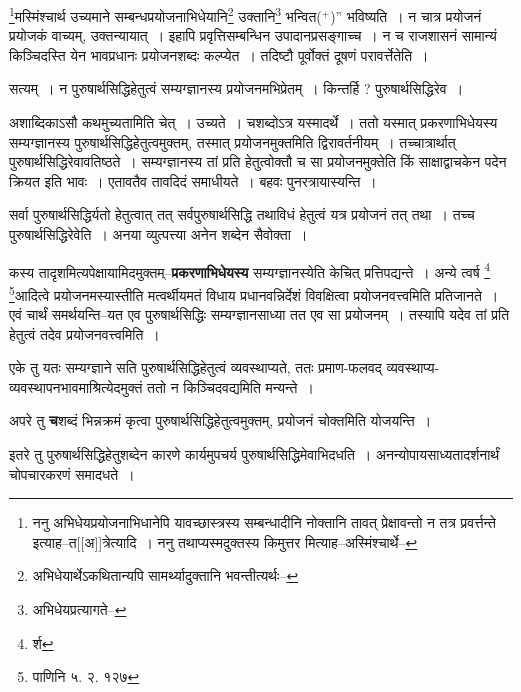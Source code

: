 \documentclass[article,12pt,a4paper]{memoir}
\newcommand{\add}[1]{($^{+}$#1)}
\begin{document}
	\footnote{ननु अभिधेयप्रयोजनाभिधानेपि यावच्छास्त्रस्य सम्बन्धादीनि नोक्तानि तावत् प्रेक्षावन्तो न तत्र प्रवर्त्तन्ते इत्याह--त[[अ]]त्रेत्यादि । ननु तथाप्यस्मदुक्तस्य किमुत्तर मित्याह--अस्मिंश्चार्थे--\cite{dp-msD-n}}\-मस्मिंश्चार्थ उच्यमाने सम्बन्धप्रयोजनाभिधेयानि\footnote{अभिधेयार्थेऽकथितान्यपि सामर्थ्यादुक्तानि भवन्तीत्यर्थः--\cite{dp-msD-n}} उक्तानि\footnote{अभिधेयप्रत्यागते--} भन्वित\add{}” भविष्यति । न चात्र प्रयोजनं प्रयोजकं वाच्यम्, उक्तन्यायात् । इहापि प्रवृत्तिसम्बन्धिन उपादानप्रसङ्गाच्च । न च राजशासनं सामान्यं किञ्चिदस्ति येन भावप्रधानः प्रयोजनशब्दः कल्प्येत । तदिष्टौ पूर्वोक्तं दूषणं परावर्त्तेतेति ।
	\pend
      

	  \pstart सत्यम् । न पुरुषार्थसिद्धिहेतुत्वं सम्यग्ज्ञानस्य प्रयोजनमभिप्रेतम् । किन्तर्हि ? पुरुषार्थसिद्धिरेव ।
	\pend
      

	  \pstart अशाब्दिकाऽसौ कथमुच्यतामिति चेत् । उच्यते । चशब्दोऽत्र यस्मादर्थे । ततो यस्मात् प्रकरणाभिधेयस्य सम्यग्ज्ञानस्य पुरुषार्थसिद्धिहेतुत्वमुक्तम्, तस्मात् प्रयोजनमुक्तमिति द्विरावर्तनीयम् । तच्चात्रार्थात् पुरुषार्थसिद्धिरेवावतिष्ठते । सम्यग्ज्ञानस्य तां प्रति हेतुत्वोक्तौ च सा प्रयोजनमुक्तेति किं साक्षाद्वाचकेन पदेन क्रियत इति भावः । एतावतैव तावदिदं समाधीयते । बहवः पुनरत्रायास्यन्ति ।
	\pend
      

	  \pstart सर्वा पुरुषार्थसिद्धिर्यतो हेतुत्वात् तत् सर्वपुरुषार्थसिद्धि तथाविधं हेतुत्वं यत्र प्रयोजनं तत् तथा । तच्च पुरुषार्थसिद्धिरेवेति । अनया व्युत्पत्त्या अनेन शब्देन सैवोक्ता ।
	\pend
      

	  \pstart कस्य तादृशमित्यपेक्षायामिदमुक्तम्--\textbf{प्रकरणाभिधेयस्य} सम्यग्ज्ञानस्येति केचित् प्रत्तिपद्यन्ते । अन्ये त्वर्ष \footnote{र्श} \footnote{पाणिनि \cite{dp-msD-n} ५. २. १२७}\-आदित्वे प्रयोजनमस्यास्तीति मत्वर्थीयमतं विधाय प्रधानवन्निर्देशं विवक्षित्वा प्रयोजनवत्त्वमिति प्रतिजानते । एवं चार्थं समर्थयन्ति--यत एव पुरुषार्थसिद्धिः सम्यग्ज्ञानसाध्या तत एव सा प्रयोजनम् । तस्यापि यदेव तां प्रति हेतुत्वं तदेव प्रयोजनवत्त्वमिति ।
	\pend
      

	  \pstart एके तु यतः सम्यग्ज्ञाने सति पुरुषार्थसिद्धिहेतुत्वं व्यवस्थाप्यते, ततः प्रमाण-फलवद् व्यवस्थाप्य-व्यवस्थापनभावमाश्रित्येदमुक्तं ततो न किञ्चिदवद्यमिति मन्यन्ते ।
	\pend
      

	  \pstart अपरे तु \textbf{च}शब्दं भिन्नक्रमं कृत्वा पुरुषार्थसिद्धिहेतुत्वमुक्तम्, प्रयोजनं चोक्तमिति योजयन्ति ।
	\pend
      

	  \pstart इतरे तु पुरुषार्थसिद्धिहेतुशब्देन कारणे कार्यमुपचर्य पुरुषार्थसिद्धिमेवाभिदधति । अनन्योपायसाध्यतादर्शनार्थं चोपचारकरणं समादधते ।
	\pend
      
\end{document}

